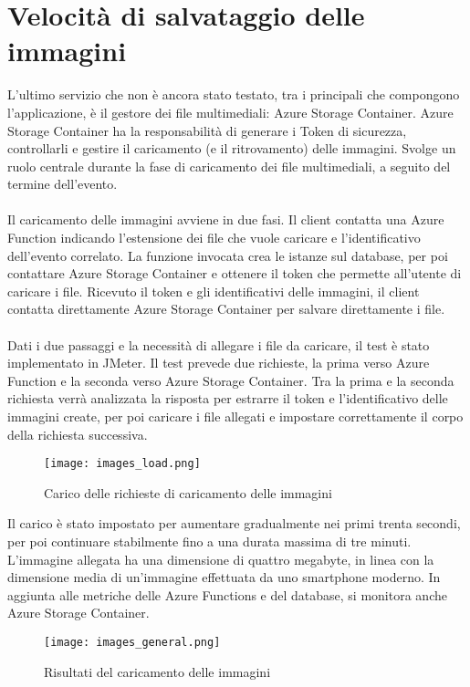 \section{Velocità di salvataggio delle immagini}
L'ultimo servizio che non è ancora stato testato,
tra i principali che compongono l'applicazione,
è il gestore dei file multimediali: Azure Storage Container.
Azure Storage Container ha la responsabilità di generare i Token di sicurezza,
controllarli e gestire il caricamento (e il ritrovamento) delle immagini.
Svolge un ruolo centrale durante la fase di caricamento dei file multimediali, 
a seguito del termine dell'evento.\\
\\
Il caricamento delle immagini avviene in due fasi.
Il client contatta una Azure Function indicando 
l'estensione dei file che vuole caricare e l'identificativo dell'evento correlato.
La funzione invocata crea le istanze sul database, 
per poi contattare Azure Storage Container e 
ottenere il token che permette all'utente di caricare i file.
Ricevuto il token e gli identificativi delle immagini, 
il client contatta direttamente Azure Storage Container per salvare direttamente i file.\\
\\
Dati i due passaggi e la necessità di allegare i file da caricare,
il test è stato implementato in JMeter.
Il test prevede due richieste, 
la prima verso Azure Function e la seconda verso Azure Storage Container.
Tra la prima e la seconda richiesta verrà analizzata la risposta per
estrarre il token e l'identificativo delle immagini create, 
per poi caricare i file allegati e impostare correttamente il corpo della richiesta successiva.
\begin{figure}[htbp]
    \begin{center}
        \texttt{[image: images\_load.png]}
        \caption{Carico delle richieste di caricamento delle immagini}
    \end{center}
\end{figure}
\clearpage
Il carico è stato impostato per aumentare gradualmente nei primi trenta secondi,
per poi continuare stabilmente fino a una durata massima di tre minuti.
L'immagine allegata ha una dimensione di quattro megabyte, 
in linea con la dimensione media di un'immagine effettuata da uno smartphone moderno.
In aggiunta alle metriche delle Azure Functions e del database,
si monitora anche Azure Storage Container.\\
\begin{figure}[htbp]
    \begin{center}
        \texttt{[image: images\_general.png]}
        \caption{Risultati del caricamento delle immagini}
    \end{center}
\end{figure}
